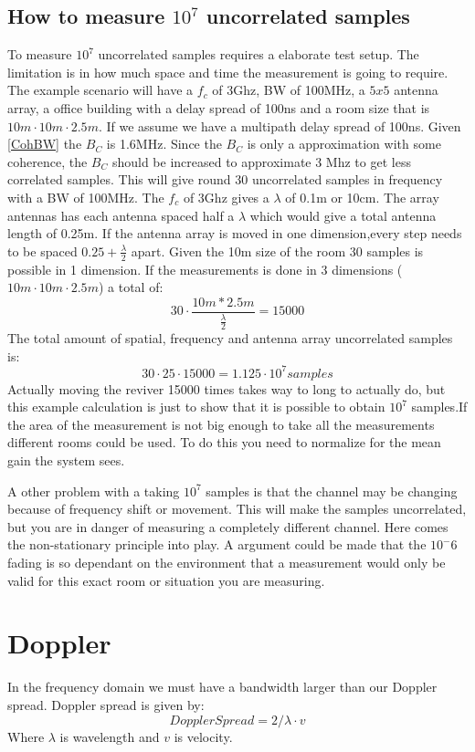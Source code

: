 \subsection{How to measure $10^7$ uncorrelated samples}
To measure $10^7$ uncorrelated samples requires a elaborate test setup. The limitation is in how much space and time the measurement is going to require. The example scenario  will have a $f_c$ of 3Ghz, BW of 100MHz, a $5x5$ antenna array, a office building with a delay spread of 100ns and a room size that is $10m \cdot 10m \cdot 2.5m$.
If we assume we have a multipath delay spread of 100ns. Given \autoref{CohBW} the $B_C$ is 1.6MHz. Since the $B_C$ is only a approximation with some coherence, the $B_C$ should be increased to approximate 3 Mhz to get less correlated samples. This will give round 30 uncorrelated samples in frequency with a BW of 100MHz.
The $f_c$ of 3Ghz gives a $\lambda$ of 0.1m or 10cm. The array antennas has each antenna spaced half a $\lambda$ which would give a total antenna length of 0.25m. If the antenna array is moved in one dimension,every step needs to be spaced $0.25+\frac{\lambda}{2}$ apart. Given the 10m size of the room 30 samples is possible in 1 dimension. If the measurements is done in 3 dimensions ($10m\cdot 10m \cdot 2.5m$) a total of:
\begin{equation}
30 \cdot \frac{10m*2.5m}{\frac{\lambda}{2}}= 15000
\end{equation}
The total amount of spatial, frequency and antenna array uncorrelated samples is:
\begin{equation}
30 \cdot 25 \cdot 15000 = 1.125 \cdot 10^7 samples
\end{equation}
Actually moving the reviver 15000 times takes way to long to actually do, but this example calculation is just to show that it is possible to obtain $10^7$ samples.If the area of the measurement is not big enough to take all the measurements different rooms could be used. To do this you need to normalize for the mean gain the system sees. 

A other problem with a taking $10^7$ samples is that the channel may be changing because of frequency shift or movement. This will make the samples uncorrelated, but you are in danger of measuring a completely different channel. Here comes the non-stationary principle into play. A argument could be made that the $10^-6$ fading is so dependant on the environment that a measurement would only be valid for this exact room or situation you are measuring.

\section{Doppler}
In the frequency domain we must have a bandwidth larger than our Doppler spread. Doppler spread is given by:
\begin{equation}
Doppler Spread = 2/\lambda \cdot v
\end{equation}
Where $\lambda$ is wavelength and $v$ is velocity.

